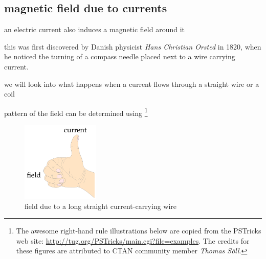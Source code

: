 \subsection{magnetic field due to currents}
an electric current also induces a magnetic field around it

this was first discovered by Danish physicist \emph{Hans Christian Orsted} in 1820, when he noticed the turning of a compass needle placed next to a wire carrying current.

we will look into what happens when a current flows through a straight wire or a coil

\cmt pattern of the field can be determined using \footnote{The awesome right-hand rule illustrations below are copied from the PSTricks web site: \url{http://tug.org/PSTricks/main.cgi?file=examples}. The credits for these figures are attributed to CTAN community member \emph{Thomas S\"{o}ll}.}

\begin{figure}[ht]
	\centering
\begin{minipage}{0.55\linewidth}
\begin{center}
\end{center}
\end{minipage}
\begin{minipage}{0.35\linewidth}
\begin{center}
\includegraphics[height=108pt]{right-hand-straight.pdf}
\end{center}
\end{minipage}

\caption*{field due to a long straight current-carrying wire}
\end{figure}

